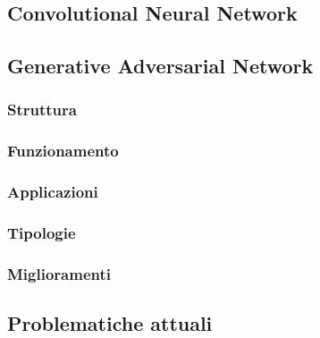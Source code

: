 \subsection{Convolutional Neural Network}

\subsection{Generative Adversarial Network}
\subsubsection{Struttura}
\subsubsection{Funzionamento}
\subsubsection{Applicazioni}
\subsubsection{Tipologie}
\subsubsection{Miglioramenti}


\subsection{Problematiche attuali}
\label{Problema}





